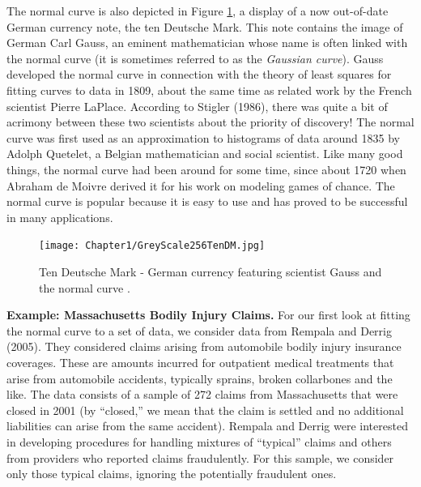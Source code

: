 The normal curve is also depicted in Figure \ref{F1:TenMarks}, a
display of a now out-of-date German currency note, the ten Deutsche
Mark. This note contains the image of German Carl Gauss, an eminent
mathematician whose name is often linked with the normal curve (it
is sometimes referred to as the \emph{Gaussian curve}). Gauss
developed the normal curve in connection with the theory of least
squares for fitting curves to data in 1809, about the same time as
related work by the French scientist Pierre LaPlace. According to
Stigler (1986), there was quite a bit of acrimony between these two
scientists about the priority of discovery! The normal curve was
first used as an approximation to histograms of data around 1835 by
Adolph Quetelet, a Belgian mathematician and social scientist. Like
many good things, the normal curve had been around for some time,
since about 1720 when Abraham de Moivre derived it for his work on
modeling games of chance. The normal curve is popular because it is
easy to use and has proved to be successful in many applications.

\begin{figure}[htp]
  \begin{center}
    \texttt{[image: Chapter1/GreyScale256TenDM.jpg]}
    \caption{\label{F1:TenMarks} \small Ten Deutsche Mark - German currency featuring scientist Gauss and the normal curve .}
  \end{center}
\end{figure}

\bigskip

\linejed


\textbf{Example: Massachusetts Bodily Injury Claims.}
 For our first look
at fitting the normal curve to a set of data, we consider data from
Rempala and Derrig (2005). They considered claims arising from
automobile bodily injury insurance coverages. These are amounts
incurred for outpatient medical treatments that arise from
automobile accidents, typically sprains, broken collarbones and the
like. The data consists of a sample of 272 claims from Massachusetts
that were closed in 2001 (by ``closed,'' we mean that the claim is
settled and no additional liabilities can arise from the same
accident). Rempala and Derrig were interested in developing
procedures for handling mixtures of ``typical'' claims and others
from providers who reported claims fraudulently. For this sample, we
consider only those typical claims, ignoring the potentially
fraudulent ones.


